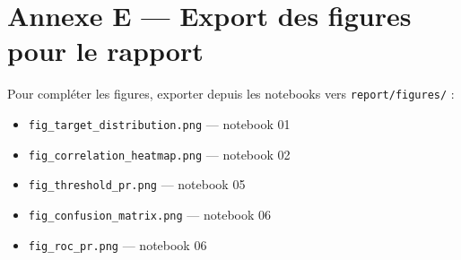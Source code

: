 \documentclass[11pt,a4paper,twoside,openright]{report}
\begin{document}
\chapter{Annexe E — Export des figures pour le rapport}
Pour compléter les figures, exporter depuis les notebooks vers \texttt{report/figures/} :
\begin{itemize}
  \item \texttt{fig\_target\_distribution.png} — notebook 01
  \item \texttt{fig\_correlation\_heatmap.png} — notebook 02
  \item \texttt{fig\_threshold\_pr.png} — notebook 05
  \item \texttt{fig\_confusion\_matrix.png} — notebook 06
  \item \texttt{fig\_roc\_pr.png} — notebook 06
\end{itemize}
\end{document}
